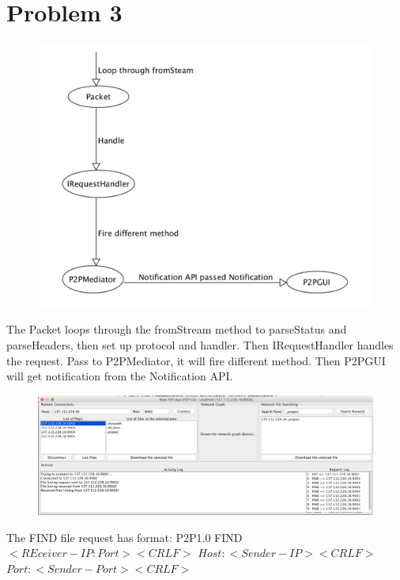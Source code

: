 \documentclass[12pt,letterpaper,boxed]{hmcpset}
\begin{document}
\section*{Problem 3}
\begin{figure}[H]
  \centering
  \includegraphics[width = 1.0\textwidth]{P3.png}
\end{figure}
The Packet loops through the fromStream method to parseStatus and parseHeaders, then set up protocol and handler. Then IRequestHandler handles the request. Pass to P2PMediator, it will fire different method. Then P2PGUI will get notification from the Notification API. \newline
\begin{figure}[H]
  \centering
  \includegraphics[width = 1.0\textwidth]{1.png}
\end{figure}
The FIND file request has format:\newline
P2P1.0 FIND $<REceiver-IP:Port><CRLF>$ \newline
$Host:<Sender-IP><CRLF>$\newline
$Port:<Sender-Port><CRLF>$\newline
\end{document}
